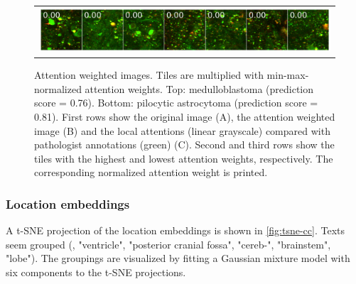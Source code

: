 \begin{figure}
\begin{tabularx}{\linewidth}{c}
        \includegraphics[width=\linewidth]{pediatric-brain-tumours/images/PMC_HHG_32_Hersenen_I-05_5x7_200slow-tiles-low-a.png}
    \end{tabularx}
    \caption[Attention weighted images]{
        Attention weighted images.
        Tiles are multiplied with min-max-normalized attention weights.
        Top: medulloblastoma (prediction score = 0.76).
        Bottom: pilocytic astrocytoma (prediction score = 0.81).
        First rows show the original image (A), the attention weighted image (B) and the local attentions (linear grayscale) compared with pathologist annotations (green) (C).
        Second and third rows show the tiles with the highest and lowest attention weights, respectively.
        The corresponding normalized attention weight is printed.
    }
    \label{fig:a-weighted-images}
\end{figure}

\subsubsection{Location embeddings}
A t-SNE projection of the location embeddings is shown in \cref{fig:tsne-cc}.
Texts seem grouped (\eg, "ventricle", "posterior cranial fossa", "cereb-", "brainstem", "lobe").
The groupings are visualized by fitting a Gaussian mixture model with six components to the t-SNE projections.

